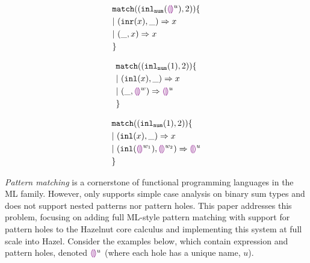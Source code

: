 \documentclass[runningheads,envcountsame,a4paper]{llncs}
\begin{document}
\begin{figure}[h]
\begin{minipage}{0.33\textwidth}
\begin{equation}
\begin{split}
  &\mathtt{match} ((\mathtt{inl}_{\mathtt{num}}({\textcolor{violet}{\llparenthesis}\textcolor{violet}{\rrparenthesis}^{u}}) , 2)) \{\\
  &|~ (\mathtt{inr}(x) , \_) \Rightarrow x \\
  &|~ (\_ , x) \Rightarrow x \\
  &\}
\end{split}
\label{eq:complete}
\end{equation}
\end{minipage}%
\begin{minipage}{0.33\textwidth}
\begin{equation}
\begin{split}
  &\mathtt{match} ((\mathtt{inl}_{\mathtt{num}}({1}) , 2)) \{\\
  &|~ (\mathtt{inl}(x) , \_) \Rightarrow x \\
  &|~ (\_ , \textcolor{violet}{\llparenthesis}\textcolor{violet}{\rrparenthesis}^{w}) \Rightarrow \textcolor{violet}{\llparenthesis}\textcolor{violet}{\rrparenthesis}^{u} \\
  &\}
\end{split}
\label{eq:pathole-exhaustive}
\end{equation}
\end{minipage}%
\begin{minipage}{0.33\textwidth}
\begin{equation}
\begin{split}
  &\mathtt{match} ((\mathtt{inl}_{\mathtt{num}}({1}) , 2)) \{\\
  &|~ (\mathtt{inl}(x) , \_) \Rightarrow x \\
  &|~ (\mathtt{inl}(\textcolor{violet}{\llparenthesis}\textcolor{violet}{\rrparenthesis}^{w_1}) , \textcolor{violet}{\llparenthesis}\textcolor{violet}{\rrparenthesis}^{w_2}) \Rightarrow \textcolor{violet}{\llparenthesis}\textcolor{violet}{\rrparenthesis}^{u} \\
  &\}
\end{split}
\label{eq:pathole-redundant}
\end{equation}
\end{minipage}%
\end{figure}

\emph{Pattern matching} is a cornerstone of functional programming languages in the ML family. 
However, \cite{DBLP:journals/pacmpl/OmarVCH19} only supports simple case analysis on binary sum types and does not support nested patterns nor pattern holes.
This paper addresses this problem, focusing on adding full ML-style pattern matching with support for pattern holes to the Hazelnut core calculus and implementing 
this system at full scale into Hazel. Consider the examples below, which contain expression and pattern holes, denoted $\textcolor{violet}{\llparenthesis}\textcolor{violet}{\rrparenthesis}^{u}$ (where each hole has a unique name, $u$). 
\end{document}
